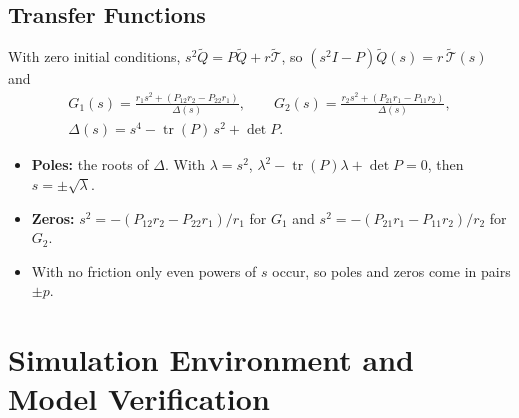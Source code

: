 \documentclass[12pt,a4paper]{article}
\begin{document}
\subsection{Transfer Functions}
With zero initial conditions, $s^2\tilde Q=P\tilde Q+r\tilde{\mathcal T}$, so $(s^2I-P)\tilde Q(s)=r\,\tilde{\mathcal T}(s)$ and
\begin{gather}
G_1(s)=\frac{r_1s^2+(P_{12}r_2-P_{22}r_1)}{\Delta(s)},\qquad
G_2(s)=\frac{r_2s^2+(P_{21}r_1-P_{11}r_2)}{\Delta(s)},\label{eq:tf}\\
\Delta(s)=s^4-\operatorname{tr}(P)\,s^2+\det P .\nonumber
\end{gather}
\begin{itemize}
\item \textbf{Poles:} the roots of $\Delta$. With $\lambda=s^2$, $\lambda^2-\operatorname{tr}(P)\lambda+\det P=0$, then $s=\pm\sqrt\lambda$.
\item \textbf{Zeros:} $s^2=-(P_{12}r_2-P_{22}r_1)/r_1$ for $G_1$ and $s^2=-(P_{21}r_1-P_{11}r_2)/r_2$ for $G_2$.
\item With no friction only even powers of $s$ occur, so poles and zeros come in pairs $\pm p$.
\end{itemize}
\begin{table}[H]
\centering
\caption{Transfer functions at the four equilibria}
\label{tab:tf}
\end{table}

\section{Simulation Environment and Model Verification}\label{sec:sim}
\end{document}

